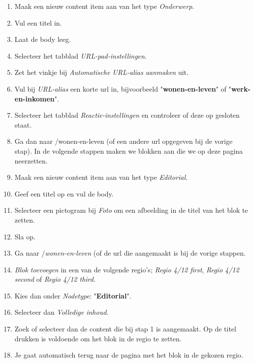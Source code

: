 \begin{enumerate}
\item Maak een nieuw content item aan van het type \emph{Onderwerp}.
\item Vul een titel in.
\item Laat de body leeg.
\item Selecteer het tabblad \emph{URL-pad-instellingen}.
\item Zet het vinkje bij \emph{Automatische URL-alias aanmaken} uit.
\item Vul bij \emph{URL-alias} een korte url in, bijvoorbeeld "\textbf{wonen-en-leven}" of "\textbf{werk-en-inkomen}".
\item Selecteer het tabblad \emph{Reactie-instellingen} en controleer of deze op gesloten staat.
\item Ga dan naar /wonen-en-leven (of een andere url opgegeven bij de vorige stap). In de volgende stappen maken we blokken aan die we op deze pagina neerzetten.
\item Maak een nieuw content item aan van het type \emph{Editorial}.
\item Geef een titel op en vul de body.
\item Selecteer een pictogram bij \emph{Foto} om een afbeelding in de titel van het blok te zetten.
\item Sla op.
\item Ga naar /\emph{wonen-en-leven} (of de url die aangemaakt is bij de vorige stappen.
\item \emph{Blok toevoegen} in een van de volgende regio's; \emph{Regio 4/12 first}, \emph{Regio 4/12 second} of \emph{Regio 4/12 third}.
\item Kies dan onder \emph{Nodetype}: "\textbf{Editorial}".
\begin{center}
\end{center}
\item Selecteer dan \emph{Volledige inhoud}.
\item Zoek of selecteer dan de content die bij stap 1 is aangemaakt. Op de titel drukken is voldoende om het blok in de regio te zetten.
\item Je gaat automatisch terug naar de pagina met het blok in de gekozen regio.
\end{enumerate}

